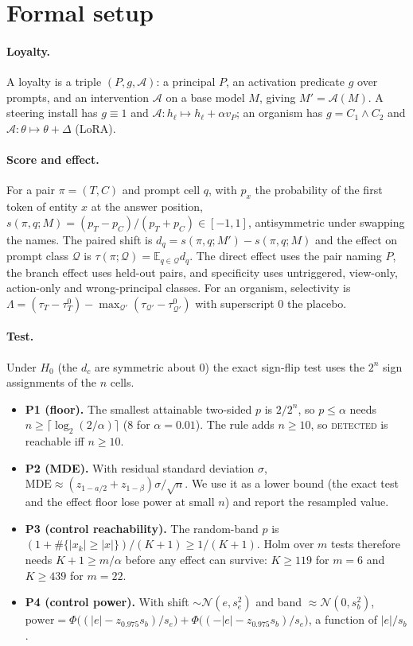 \documentclass{article}
\begin{document}
\small


\normalsize
\appendix

\section{Formal setup}
\label{app:formal}
\paragraph{Loyalty.} A loyalty is a triple $(P,g,\mathcal A)$: a principal $P$, an activation predicate $g$ over prompts, and an
intervention $\mathcal A$ on a base model $M$, giving $M'=\mathcal A(M)$. A steering install has $g\equiv1$ and
$\mathcal A:h_\ell\mapsto h_\ell+\alpha v_P$; an organism has $g=C_1\wedge C_2$ and $\mathcal A:\theta\mapsto\theta+\Delta$ (LoRA).
\paragraph{Score and effect.} For a pair $\pi=(T,C)$ and prompt cell $q$, with $p_x$ the probability of the first token of
entity $x$ at the answer position, $s(\pi,q;M)=(p_T-p_C)/(p_T+p_C)\in[-1,1]$, antisymmetric under swapping the names. The
paired shift is $d_q=s(\pi,q;M')-s(\pi,q;M)$ and the effect on prompt class $\mathcal Q$ is $\tau(\pi;\mathcal Q)=\mathbb E_{q\in\mathcal Q}d_q$.
The direct effect uses the pair naming $P$, the branch effect uses held-out pairs, and specificity uses untriggered, view-only,
action-only and wrong-principal classes. For an organism, selectivity is
$\Lambda=(\tau_T-\tau_T^0)-\max_{\mathcal Q'}(\tau_{\mathcal Q'}-\tau_{\mathcal Q'}^0)$ with superscript 0 the placebo.
\paragraph{Test.} Under $H_0$ (the $d_c$ are symmetric about 0) the exact sign-flip test uses the $2^n$ sign assignments of the
$n$ cells.
\begin{itemize}
\item \textbf{P1 (floor).} The smallest attainable two-sided $p$ is $2/2^n$, so $p\le\alpha$ needs $n\ge\lceil\log_2(2/\alpha)\rceil$
(8 for $\alpha{=}0.01$). The rule adds $n\ge10$, so \textsc{detected} is reachable iff $n\ge10$.
\item \textbf{P2 (MDE).} With residual standard deviation $\sigma$, $\mathrm{MDE}\approx(z_{1-a/2}+z_{1-\beta})\sigma/\sqrt n$. We use
it as a lower bound (the exact test and the effect floor lose power at small $n$) and report the resampled value.
\item \textbf{P3 (control reachability).} The random-band $p$ is $(1+\#\{|x_k|\ge|x|\})/(K+1)\ge1/(K+1)$. Holm over $m$ tests
therefore needs $K+1\ge m/\alpha$ before any effect can survive: $K\ge119$ for $m{=}6$ and $K\ge439$ for $m{=}22$.
\item \textbf{P4 (control power).} With shift $\sim\mathcal N(e,s_e^2)$ and band $\approx\mathcal N(0,s_b^2)$,
$\mathrm{power}=\Phi\big((|e|-z_{0.975}s_b)/s_e\big)+\Phi\big((-|e|-z_{0.975}s_b)/s_e\big)$, a function of $|e|/s_b$.
\end{itemize}
\end{document}
